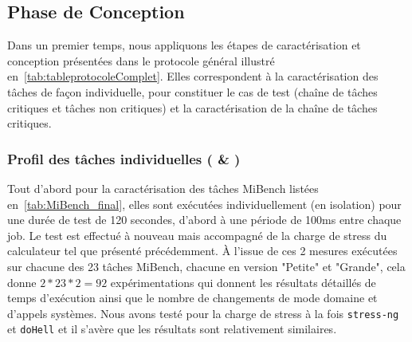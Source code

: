 \documentclass[french, a4paper, 11pt, twoside, pdftex]{StyleThese}
\begin{document}
\subsection{Phase de Conception}
Dans un premier temps, nous appliquons les étapes de caractérisation et conception présentées dans le protocole général illustré en~\autoref{tab:tableprotocoleComplet}. Elles correspondent à la caractérisation des tâches de façon individuelle, pour constituer le cas de test (chaîne de tâches critiques et tâches non critiques) et la caractérisation de la chaîne de tâches critiques.

\subsubsection{Profil des tâches individuelles ( \& )}
Tout d'abord pour la caractérisation des tâches MiBench listées en~\autoref{tab:MiBench_final}, elles sont exécutées individuellement (en isolation) pour une durée de test de 120 secondes, d'abord à une période de 100ms entre chaque job. Le test est effectué à nouveau mais accompagné de la charge de stress du calculateur tel que présenté précédemment. À l'issue de ces 2 mesures exécutées sur chacune des 23 tâches MiBench, chacune en version "Petite" et "Grande", cela donne $2*23*2 = 92$ expérimentations qui donnent les résultats détaillés de temps d'exécution ainsi que le nombre de changements de mode domaine et d'appels systèmes. Nous avons testé pour la charge de stress à la fois \texttt{stress-ng} et \texttt{doHell} et il s'avère que les résultats sont relativement similaires.
\end{document}
